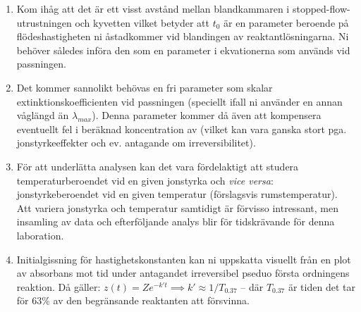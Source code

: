 \begin{enumerate}
\item Kom ihåg att det är ett visst
  avstånd mellan blandkammaren i stopped-flow-utrustningen och
  kyvetten vilket betyder att $t_0$ är en parameter beroende på
  flödeshastigheten ni åstadkommer vid blandingen av
  reaktantlösningarna. Ni behöver således införa den som en parameter i
  ekvationerna som används vid passningen.
\item Det kommer sannolikt behövas en fri parameter som skalar
  extinktionskoefficienten vid passningen (speciellt ifall ni använder en
  annan våglängd än $\lambda_{max}$). Denna parameter kommer då även att
  kompensera eventuellt fel i beräknad koncentration av 
  (vilket kan vara ganska stort pga. jonstyrkeeffekter och ev. antagande
  om irreversibilitet).
\item För att underlätta analysen kan det vara fördelaktigt att studera
  temperaturberoendet vid en given jonstyrka och {\em vice versa}:
  jonstyrkeberoendet vid en given temperatur (förslagsvis
  rumstemperatur). Att variera jonstyrka och temperatur samtidigt är
  förvisso intressant, men insamling av data och efterföljande analys
  blir för tidskrävande för denna laboration.
\item Initialgissning för hastighetskonstanten kan ni uppskatta visuellt
  från en plot av absorbans mot tid under antagandet irreversibel pseduo
  första ordningens reaktion. Då gäller: $z(t) = Ze^{-k' t} \implies k'
  \approx 1/T_{0.37}$ -- där $T_{0.37}$ är tiden det tar för 63\% av den
  begränsande reaktanten att försvinna.



\end{enumerate}

